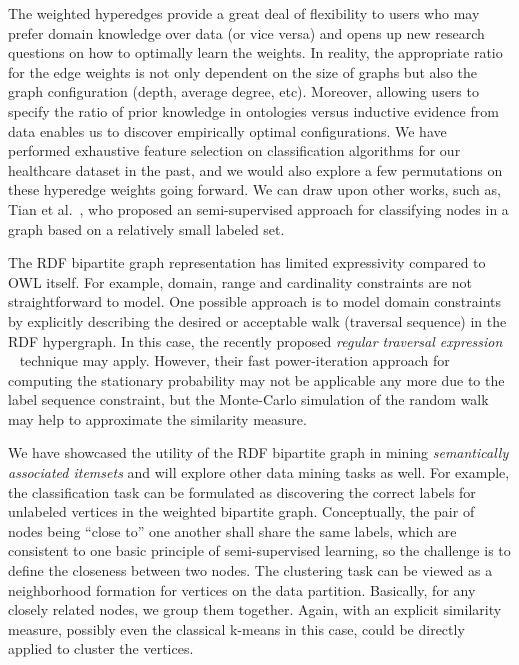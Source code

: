 The weighted hyperedges provide a great deal of flexibility to users who may prefer domain knowledge over data (or vice versa) and opens up new research questions on how to optimally learn the weights. In reality, the appropriate ratio for the edge weights is not only dependent on the size of graphs but also the graph configuration (depth, average degree, etc). Moreover, allowing users to specify the ratio of prior knowledge in ontologies versus inductive evidence from data enables us to discover empirically optimal configurations. We have performed exhaustive feature selection on classification algorithms for our healthcare dataset in the past, and we would also explore a few permutations on these hyperedge weights going forward. We can draw upon other works, such as, Tian et al.~\cite{Tian09}, who proposed an semi-supervised approach for classifying nodes in a graph based on a relatively small labeled set.

The RDF bipartite graph representation has limited expressivity compared to OWL itself. For example, domain, range and cardinality constraints are not straightforward to model.  One possible approach is to model domain constraints by explicitly describing the desired or acceptable walk (traversal sequence) in the RDF hypergraph. In this case, the recently proposed \emph{regular traversal expression} ~\cite{Marko10} technique may apply. However, their fast power-iteration approach for computing the stationary probability may not be applicable any more due to the label sequence constraint, but the Monte-Carlo simulation of the random walk may help to approximate the similarity measure.

We have showcased the utility of the RDF bipartite graph in mining \emph{semantically associated itemsets} and will explore other data mining tasks as well. For example, the classification task can be formulated as discovering the correct labels for unlabeled vertices in the weighted bipartite graph. Conceptually, the pair of nodes being ``close to'' one another shall share the same labels, which are consistent to one basic principle of semi-supervised learning, so the challenge is to define the closeness between two nodes. The clustering task can be viewed as a neighborhood formation for vertices on the data partition. Basically, for any closely related nodes, we group them together. Again, with an explicit similarity measure, possibly even the classical k-means in this case, could be directly applied to cluster the vertices. 